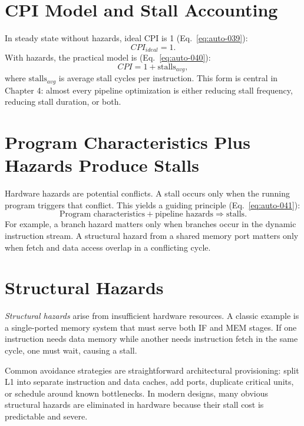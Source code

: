 \section{CPI Model and Stall Accounting}\label{sec:auto-037}
In steady state without hazards, ideal CPI is 1 (Eq.~\eqref{eq:auto-039}):
\begin{equation}\label{eq:auto-039}
    CPI_{ideal}=1.
\end{equation}
With hazards, the practical model is (Eq.~\eqref{eq:auto-040}):
\begin{equation}\label{eq:auto-040}
    CPI = 1 + \text{stalls}_{avg},
\end{equation}
where $\text{stalls}_{avg}$ is average stall cycles per instruction.
This form is central in Chapter 4: almost every pipeline optimization is either reducing stall frequency, reducing stall duration, or both.


\section{Program Characteristics Plus Hazards Produce Stalls}\label{sec:auto-038}
Hardware hazards are potential conflicts.
A stall occurs only when the running program triggers that conflict.
This yields a guiding principle (Eq.~\eqref{eq:auto-041}):
\begin{equation}\label{eq:auto-041}
    \text{Program characteristics} + \text{pipeline hazards} \Rightarrow \text{stalls}.
\end{equation}
For example, a branch hazard matters only when branches occur in the dynamic instruction stream.
A structural hazard from a shared memory port matters only when fetch and data access overlap in a conflicting cycle.


\section{Structural Hazards}\label{sec:auto-039}
\textit{Structural hazards} arise from insufficient hardware resources.
A classic example is a single-ported memory system that must serve both IF and MEM stages.
If one instruction needs data memory while another needs instruction fetch in the same cycle, one must wait, causing a stall.

Common avoidance strategies are straightforward architectural provisioning: split L1 into separate instruction and data caches, add ports, duplicate critical units, or schedule around known bottlenecks.
In modern designs, many obvious structural hazards are eliminated in hardware because their stall cost is predictable and severe.

